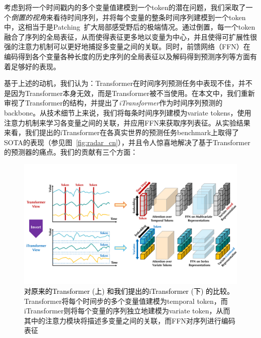 \documentclass[twoside,12pt]{article}
\newcommand{\update}[1]{{\textcolor{black}{#1}}}
\begin{document}
考虑到将一个时间戳内的多个变量值建模到一个token的潜在问题，我们采取了一个\emph{倒置的视角}来看待时间序列，并将每个变量的整条时间序列建模到一个token中，这相当于是Patching~\citep{PatchTST}扩大局部感受野后的极端情况。通过倒置，每一个token融合了序列的全局表征，从而使得表征更多地以变量为中心，并且使得可扩展性很强的注意力机制可以更好地捕捉多变量之间的关联。同时，前馈网络（FFN）在编码得到各个变量各种长度的历史序列的全局表征以及解码得到预测序列等方面有着足够好的表现。

基于上述的动机，我们认为：Transformer在时间序列预测任务中表现不佳，并不是因为Transformer本身无效，而是Transformer被不当使用。在本文中，我们重新审视了Transformer的结构，并提出了\emph{iTransformer}作为时间序列预测的backbone。从技术细节上来说，我们将每条时间序列建模为variate tokens，使用注意力机制来学习各变量之间的关联，并应用FFN来获取序列表征。从实验结果来看，我们提出的iTransformer在各真实世界的预测任务benchmark上取得了SOTA的表现（参见图~\ref{fig:radar_cn}），并且令人惊喜地解决了基于Transformer的预测器的痛点。我们的贡献有三个方面：


\begin{figure}[t]
  \begin{center}
    \includegraphics[width=0.95\columnwidth]{pic/motivation.pdf}
    \vspace{-10pt}
    \caption{\small{\update{对原来的Transformer (上) 和我们提出的iTransformer (下) 的比较。}Transformer将每个时间步的多个变量值建模为temporal token，而iTransformer则将每个变量的序列独立地建模为variate token，从而其中的注意力模块将描述多变量之间的关联，而FFN对序列进行编码表征}}
    \label{fig:motivation_cn}
  \end{center}
  \vspace{-14pt}
\end{figure}
\end{document}
